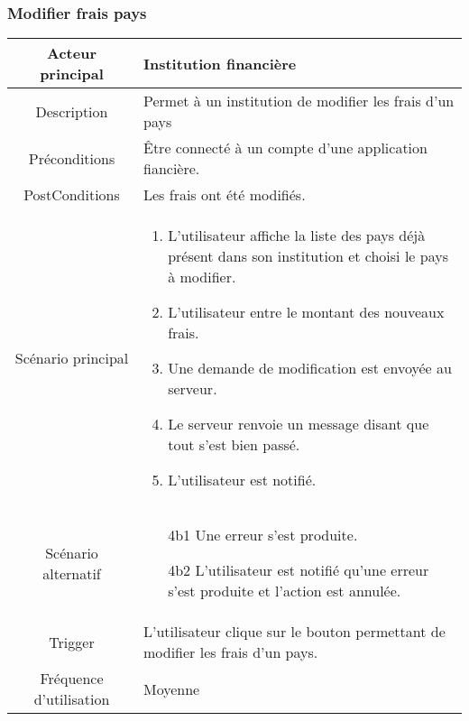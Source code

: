 \documentclass{article}
\begin{document}
\newpage

\subsubsection{Modifier frais pays}
\begin{table}[h]
   \begin{tabular}{|c|p{10cm}|}
      \hline
      Acteur principal&Institution financière\\
      \hline
      Description&Permet à un institution de modifier les frais d'un pays\\
      \hline
      Préconditions&Être connecté à un compte d'une application fiancière.\\
      \hline
      PostConditions&Les frais ont été modifiés.\\
      \hline
      Scénario principal& 
            \begin{enumerate}
               \item L'utilisateur affiche la liste des pays déjà présent dans son institution et choisi le pays à modifier.
               \item L'utilisateur entre le montant des nouveaux frais.
               \item Une demande de modification est envoyée au serveur.
               \item Le serveur renvoie un message disant que tout s'est bien passé.
               \item L'utilisateur est notifié.
            \end{enumerate}     \\
      \hline
      Scénario alternatif&
            \begin{itemize}
               \item[4b1] Une erreur s'est produite.
               \item[4b2] L'utilisateur est notifié qu'une erreur s'est produite et l'action est annulée.  
            \end{itemize}\\
      \hline
      Trigger&L'utilisateur clique sur le bouton permettant de modifier les frais d'un pays.\\
      \hline
      Fréquence d'utilisation&Moyenne\\
      \hline
   \end{tabular}
\end{table}
\end{document}
